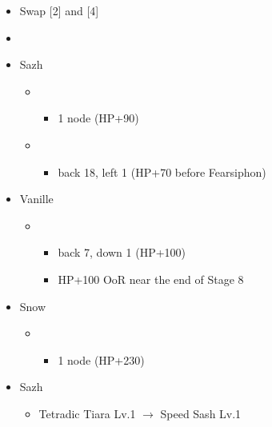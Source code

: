 \begin{menu}
	\begin{itemize}
	\paradigm
		\begin{itemize}
			\item Swap [2] and [4]
			\item {}%
				{\paradigmline{\com}{(\med)}{(\sen)}}%
				{\paradigmline{(\com)}{\sab}{(\sen)}}%
				{\paradigmline{\sen}{\med}{\sen}}%
				{\paradigmline[4]{\sen}{(\sen)}{\sen}}%
				{\paradigmline{\rav}{\med}{\sen}}%
				{\paradigmline{(\com)}{\rav}{(\sen)}}%
		\end{itemize}
	\crystarium
		\begin{itemize}
			\item Sazh
				\begin{itemize}
					\item \com
						\begin{itemize}
							\item 1 node (HP+90)
						\end{itemize}
					\item \rav
						\begin{itemize}
							\item back 18, left 1 (HP+70 before Fearsiphon)
						\end{itemize}
				\end{itemize}
			\item Vanille
				\begin{itemize}
					\item \rav
						\begin{itemize}
							\item back 7, down 1 (HP+100)
							\item HP+100 OoR near the end of Stage 8
						\end{itemize}
				\end{itemize}
			\item Snow
				\begin{itemize}
					\item \com
						\begin{itemize}
							\item 1 node (HP+230)
						\end{itemize}
				\end{itemize}
		\end{itemize}
	\equip
		\begin{itemize}
			\item Sazh
				\begin{itemize}
					\item Tetradic Tiara Lv.1 $\rightarrow$ Speed Sash Lv.1

\end{itemize}
\end{itemize}
\end{itemize}
\end{menu}
